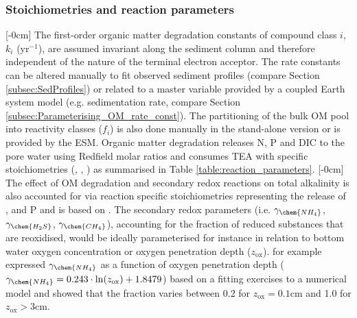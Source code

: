 \documentclass[gmd, manuscript]{copernicus}
\begin{document}
\subsubsection {Stoichiometries and reaction parameters}\label{subsubsec:Stoich_reaction_params}
[-0cm]%
The first-order organic matter degradation constants of compound class $i$, $k_i$ (yr$^{-1}$), are assumed invariant along the sediment column and therefore independent of the nature 
of the terminal electron acceptor. The rate constants can be altered manually to fit observed sediment profiles (compare Section \ref{subsec:SedProfiles}) or related to a master variable 
provided by a coupled Earth system model (e.g. sedimentation rate, compare Section \ref{subsec:Parameterising_OM_rate_const}). 
The partitioning of the bulk OM pool into reactivity classes ($f_i$) is also done manually in the stand-alone version or is provided by the ESM. 
Organic matter degradation releases N, P and DIC to the pore water using Redfield molar ratios \citep{redfield1963influence} and consumes TEA with specific stoichiometries (, , ) as summarised in Table \ref{table:reaction_parameters}. 
[-0cm]%
The effect of OM degradation and secondary redox reactions on total alkalinity is also accounted for via reaction specific stoichiometries representing the release of ,  and P and is based on \citet[][]{jourabchi_quantitative_2005}. 
The secondary redox parameters (i.e. $\gamma_{\chem{NH_4}}$, $\gamma_{\chem{H_2S}}$, $\gamma_{\chem{CH_4}}$), accounting for the fraction of reduced substances that are reoxidised, would be ideally parameterised for instance in relation to bottom water 
oxygen concentration or oxygen penetration depth ($z_{\mathrm{ox}}$). \citet{gypens_simple_2008} for example expressed $\gamma_{\chem{NH_4}}$ as a function of oxygen penetration depth ($\gamma_{\chem{NH_4}} = 0.243 \cdot \mathrm{ln}(z_{\mathrm{ox}}) + 1.8479$) 
based on a fitting exercises to a numerical model and showed that the fraction varies between 0.2 for $z_{\mathrm{ox}}=0.1$cm and 1.0 for $z_{\mathrm{ox}}>3$cm. 
\end{document}
